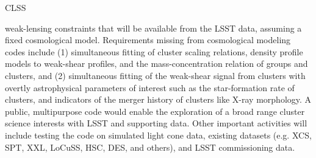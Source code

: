 {\begin{tasklist}{CLSS}
\begin{task}
{weak-lensing constraints that will be available from the LSST data, assuming
a fixed cosmological model.
Requirements missing from cosmological modeling codes include (1) simultaneous fitting 
of cluster scaling relations, density profile models to weak-shear 
profiles, and the mass-concentration relation of groups and clusters, 
and (2) simultaneous fitting of the weak-shear signal from clusters with 
overtly astrophysical parameters of interest such as the star-formation 
rate of clusters, and indicators of the merger history of clusters like 
X-ray morphology.  A public, multipurpose code would enable the
exploration of a broad range cluster science 
interests with LSST and supporting data. Other important activities 
will include testing the code on simulated light cone data, existing 
datasets (e.g. XCS, SPT, XXL, LoCuSS, HSC, DES, and others), and LSST 
commissioning data.
}
~\\
\end{task}
\end{tasklist}
}
